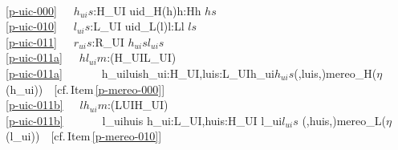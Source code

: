 \pos{\psno}{\mnewfoil}\LLLL
\bp
{}\\
\ref{p-uic-000}\ \ \ $h_{ui}s$:H\_UI {\IS} {\LBRACE}uid\_H(h){\BAR}h:H{\RDOT}h {\ISIN} $hs${\RBRACE}\\
\ref{p-uic-010}\ \ \ $l_{ui}s$:L\_UI {\IS} {\LBRACE}uid\_L(l){\BAR}l:L{\RDOT}l {\ISIN} $ls${\RBRACE} \\
\ref{p-uic-011}\ \ \ $r_{ui}s$:R\_UI {\IS} $h_{ui}s${\UNION}$l_{ui}s$\\
\ref{p-uic-011a}\ \ \ $hl_{ui}m$:(H\_UI{\MARROW}L\_UI) {\IS} \\
\ref{p-uic-011a}\ \ \ \ \ \ \ {\LBRACKET}h\_ui{\MAPSTO}luis{\BAR}h\_ui:H\_UI,luis:L\_UIh\_ui{\ISIN}$h_{ui}s${\WEDGE}({\UNDERLINE},luis,{\UNDERLINE}){\EQ}mereo\_H($\eta$(h\_ui)){\RBRACKET}\ \ [cf.\,Item\,\ref{p-mereo-000}]\\
\ref{p-uic-011b}\ \ \ $lh_{ui}m$:(L{\PLUS}UI{\MARROW}H\_UI) {\IS} \\
\ref{p-uic-011b}\ \ \ \ \ \ \ {\LBRACKET}l\_ui{\MAPSTO}huis {\BAR} h\_ui:L\_UI,huis:H\_UI {\RDOT} l\_ui{\ISIN}$l_{ui}s$ {\WEDGE} ({\UNDERLINE},huis,{\UNDERLINE}){\EQ}mereo\_L($\eta$(l\_ui)){\RBRACKET}\ \ [cf.\,Item\,\ref{p-mereo-010}]\\
